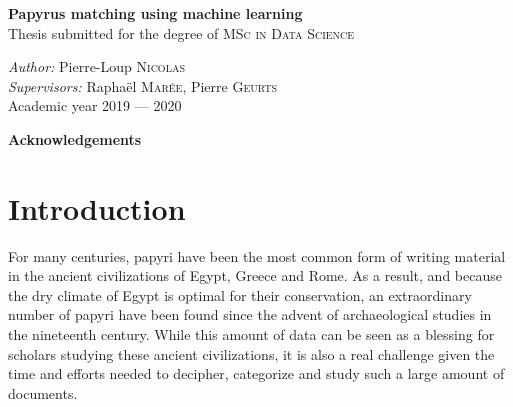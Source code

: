 \documentclass[11pt]{report}
\begin{document}
\begin{center}

    { \Large  \textbf{Papyrus matching using machine learning}\\[0.2cm] }
    {Thesis submitted for the degree of \textsc{MSc in Data Science}}
    
    {\textit{Author:} Pierre-Loup \textsc{Nicolas}\\
     \textit{Supervisors:} Raphaël \textsc{Marée}, Pierre \textsc{Geurts}\\[0.1cm]}
    {Academic year 2019 — 2020}\\[1cm]

\end{center}



\newpage


\vspace*{5cm}
\begin{center}
{\Large \textbf{Acknowledgements}}\\[1cm]
\end{center}
    
    

\newpage

\tableofcontents


\newpage


\chapter{Introduction}

For many centuries, papyri have been the most common form of writing material in the ancient civilizations of Egypt, Greece and Rome. As a result, and because the dry climate of Egypt is optimal for their conservation, an extraordinary number of papyri have been found since the advent of archaeological studies in the nineteenth century. While this amount of data can be seen as a blessing for scholars studying these ancient civilizations, it is also a real challenge given the time and efforts needed to decipher, categorize and study such a large amount of documents.\newline
\end{document}
